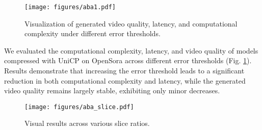 \begin{figure}[t]
    \centering
    \texttt{[image: figures/aba1.pdf]}
    \caption{Visualization of generated video quality, latency, and computational complexity under different error thresholds.}
    \label{fig:flops_comparison}
    \vspace{-4mm}
\end{figure}
\begin{table}[t]
\caption{Quantitative analysis of different caching strategies.}
\label{table:Comparison of different strategies}
\centering
{}
\vspace{-4mm}
\end{table}
 We evaluated the computational complexity, latency, and video quality of models compressed with UniCP on OpenSora across different error thresholds (Fig. \ref{fig:flops_comparison}). Results demonstrate that increasing the error threshold leads to a significant reduction in both computational complexity and latency, while the generated video quality remains largely stable, exhibiting only minor decreases.
\begin{figure}[t]
    \centering
    \texttt{[image: figures/aba\_slice.pdf]}
    \caption{Visual results across various slice ratios.}
    \label{fig:slice1}
    \vspace{-4mm}
\end{figure}

